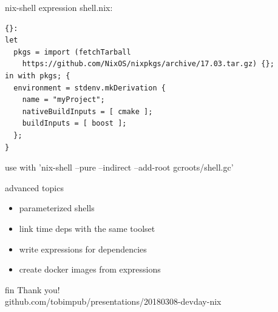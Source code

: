 \documentclass[aspectratio=169]{beamer}
\begin{document}

\begin{frame}[fragile]{nix-shell expression}
    shell.nix:
    \small
\begin{lstlisting}[style=base,breaklines=false]
{}:
let
  pkgs = import (fetchTarball
    https://github.com/NixOS/nixpkgs/archive/17.03.tar.gz) {};
in with pkgs; {
  environment = stdenv.mkDerivation {
    name = "myProject";
    nativeBuildInputs = [ cmake ];
    buildInputs = [ boost ];
  };
}
\end{lstlisting}
use with 'nix-shell --pure --indirect --add-root gcroots/shell.gc'
\end{frame}

\begin{frame}{advanced topics}
    \begin{itemize}
        \item parameterized shells
        \item link time deps with the same toolset
        \item write expressions for dependencies
        \item create docker images from expressions
    \end{itemize}
\end{frame}

\begin{frame}[c]{fin}
\centering
Thank you! \\
github.com/tobimpub/presentations/20180308-devday-nix
\end{frame}
\end{document}
